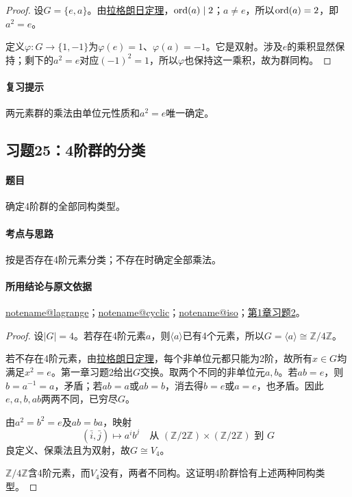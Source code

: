 \documentclass[UTF8,a4paper,11pt,fontset=windows]{ctexart}
\makeatletter
\newcommand{\Z}{\mathbb Z}\newcommand{\Q}{\mathbb Q}
\newcommand{\noteref}[1]{\hyperref[note:#1]{\csname notename@#1\endcsname}}
\newcommand{\proofref}[2]{\hyperref[note:#1]{#2}}
\newcommand{\exref}[2]{\hyperref[ex:#1:#2]{第#1章习题#2}}
\makeatother
\begin{document}
\begin{proof}
设$G=\{e,a\}$。由\proofref{lagrange}{拉格朗日定理}，$\operatorname{ord}(a)\mid2$；$a\ne e$，所以$\operatorname{ord}(a)=2$，即$a^2=e$。

定义$\varphi:G\to\{1,-1\}$为$\varphi(e)=1$、$\varphi(a)=-1$。它是双射。涉及$e$的乘积显然保持；剩下的$a^2=e$对应$(-1)^2=1$，所以$\varphi$也保持这一乘积，故为群同构。
\end{proof}

\paragraph{复习提示}
两元素群的乘法由单位元性质和$a^2=e$唯一确定。


\subsection{习题25：\texorpdfstring{4阶群的分类}{4阶群的分类}}
\label{ex:1:25}

\paragraph{题目}
确定4阶群的全部同构类型。

\paragraph{考点与思路}
按是否存在4阶元素分类；不存在时确定全部乘法。

\paragraph{所用结论与原文依据}
\noteref{lagrange}；\noteref{cyclic}；\noteref{iso}；\exref{1}{2}。


\begin{proof}
设$|G|=4$。若存在4阶元素$a$，则$\langle a\rangle$已有4个元素，所以$G=\langle a\rangle\cong\Z/4\Z$。

若不存在4阶元素，由\proofref{lagrange}{拉格朗日定理}，每个非单位元都只能为2阶，故所有$x\in G$均满足$x^2=e$。第一章习题2给出$G$交换。取两个不同的非单位元$a,b$。若$ab=e$，则$b=a^{-1}=a$，矛盾；若$ab=a$或$ab=b$，消去得$b=e$或$a=e$，也矛盾。因此$e,a,b,ab$两两不同，已穷尽$G$。

由$a^2=b^2=e$及$ab=ba$，映射
\[
(\bar i,\bar j)\longmapsto a^ib^j\quad
\text{从 }(\Z/2\Z)\times(\Z/2\Z)\text{ 到 }G
\]
良定义、保乘法且为双射，故$G\cong V_4$。

$\Z/4\Z$含4阶元素，而$V_4$没有，两者不同构。这证明4阶群恰有上述两种同构类型。
\end{proof}
\end{document}
